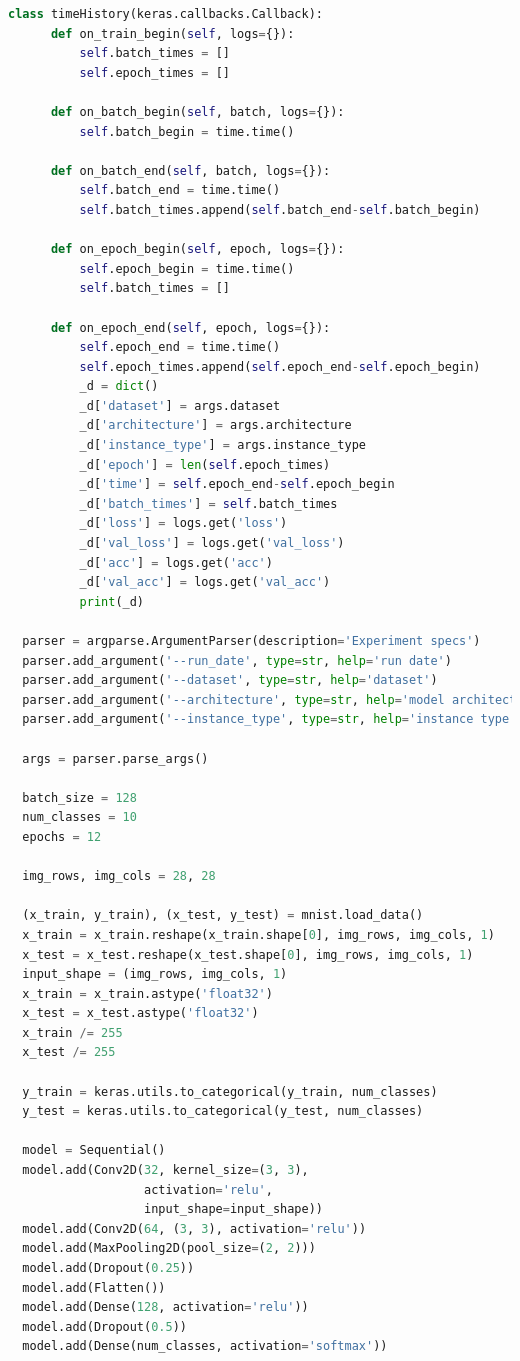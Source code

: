 \documentclass[12pt,a4paper,twoside]{article}
\begin{document}
\begin{appendices}
\begin{lstlisting}[language=python]
  class timeHistory(keras.callbacks.Callback):
      def on_train_begin(self, logs={}):
          self.batch_times = []
          self.epoch_times = []

      def on_batch_begin(self, batch, logs={}):
          self.batch_begin = time.time()

      def on_batch_end(self, batch, logs={}):
          self.batch_end = time.time()
          self.batch_times.append(self.batch_end-self.batch_begin)

      def on_epoch_begin(self, epoch, logs={}):
          self.epoch_begin = time.time()
          self.batch_times = []

      def on_epoch_end(self, epoch, logs={}):
          self.epoch_end = time.time()
          self.epoch_times.append(self.epoch_end-self.epoch_begin)
          _d = dict()
          _d['dataset'] = args.dataset
          _d['architecture'] = args.architecture
          _d['instance_type'] = args.instance_type
          _d['epoch'] = len(self.epoch_times)
          _d['time'] = self.epoch_end-self.epoch_begin
          _d['batch_times'] = self.batch_times
          _d['loss'] = logs.get('loss')
          _d['val_loss'] = logs.get('val_loss')
          _d['acc'] = logs.get('acc')
          _d['val_acc'] = logs.get('val_acc')
          print(_d)

  parser = argparse.ArgumentParser(description='Experiment specs')
  parser.add_argument('--run_date', type=str, help='run date')
  parser.add_argument('--dataset', type=str, help='dataset')
  parser.add_argument('--architecture', type=str, help='model architecture')
  parser.add_argument('--instance_type', type=str, help='instance type')

  args = parser.parse_args()

  batch_size = 128
  num_classes = 10
  epochs = 12

  img_rows, img_cols = 28, 28

  (x_train, y_train), (x_test, y_test) = mnist.load_data()
  x_train = x_train.reshape(x_train.shape[0], img_rows, img_cols, 1)
  x_test = x_test.reshape(x_test.shape[0], img_rows, img_cols, 1)
  input_shape = (img_rows, img_cols, 1)
  x_train = x_train.astype('float32')
  x_test = x_test.astype('float32')
  x_train /= 255
  x_test /= 255

  y_train = keras.utils.to_categorical(y_train, num_classes)
  y_test = keras.utils.to_categorical(y_test, num_classes)

  model = Sequential()
  model.add(Conv2D(32, kernel_size=(3, 3),
                   activation='relu',
                   input_shape=input_shape))
  model.add(Conv2D(64, (3, 3), activation='relu'))
  model.add(MaxPooling2D(pool_size=(2, 2)))
  model.add(Dropout(0.25))
  model.add(Flatten())
  model.add(Dense(128, activation='relu'))
  model.add(Dropout(0.5))
  model.add(Dense(num_classes, activation='softmax'))


\end{lstlisting}
\end{appendices}
\end{document}
